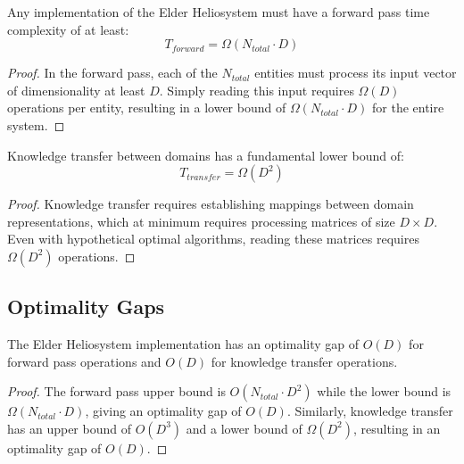 \begin{theorem}
Any implementation of the Elder Heliosystem must have a forward pass time complexity of at least:
\begin{equation}
T_{forward} = \Omega(N_{total} \cdot D)
\end{equation}
\end{theorem}

\begin{proof}
In the forward pass, each of the $N_{total}$ entities must process its input vector of dimensionality at least $D$. Simply reading this input requires $\Omega(D)$ operations per entity, resulting in a lower bound of $\Omega(N_{total} \cdot D)$ for the entire system.
\end{proof}

\begin{theorem}
Knowledge transfer between domains has a fundamental lower bound of:
\begin{equation}
T_{transfer} = \Omega(D^2)
\end{equation}
\end{theorem}

\begin{proof}
Knowledge transfer requires establishing mappings between domain representations, which at minimum requires processing matrices of size $D \times D$. Even with hypothetical optimal algorithms, reading these matrices requires $\Omega(D^2)$ operations.
\end{proof}

\subsection{Optimality Gaps}

\begin{theorem}
The Elder Heliosystem implementation has an optimality gap of $O(D)$ for forward pass operations and $O(D)$ for knowledge transfer operations.
\end{theorem}

\begin{proof}
The forward pass upper bound is $O(N_{total} \cdot D^2)$ while the lower bound is $\Omega(N_{total} \cdot D)$, giving an optimality gap of $O(D)$. Similarly, knowledge transfer has an upper bound of $O(D^3)$ and a lower bound of $\Omega(D^2)$, resulting in an optimality gap of $O(D)$.
\end{proof}

